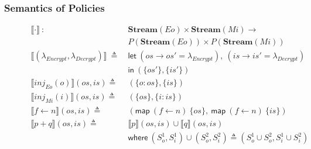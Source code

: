 \documentclass[12pt, letterpaper]{article}
\newcommand\interp[1]{\llbracket #1 \rrbracket}
\begin{document}
      \subsubsection{Semantics of Policies}\label{sec:spec:sem:pol}
        \begin{figure}
          \centering
          \begin{align*} 
            \interp{ \cdot }\ 
              :\ \ &
              \mathbf{Stream}(Eo)\times \mathbf{Stream}(Mi) \rightarrow \\
              & P(\mathbf{Stream}(Eo))\times P(\mathbf{Stream}(Mi)) 
              \\
            \interp{(\lambda_{Encrypt}, \lambda_{Decrypt})}\
              \triangleq\
              & \mathsf{let}\ (os \rightarrow os' = \lambda_{Encrypt}),
                            \ (is \rightarrow is' = \lambda_{Decrypt})\\
              & \mathsf{in}\
              (\{\mathit{os'}\}, \{\mathit{is'}\})
              \\
            \interp { inj_{Eo}(o) }(\mathit{os}, \mathit{is})
              \triangleq\ &
              (\{\mathit{o : os}\}, \{\mathit{is}\}) 
              \\
            \interp { inj_{Mi}(i) }(\mathit{os}, \mathit{is})
              \triangleq\ &
              (\{\mathit{os}\},\{ \mathit{i : is}\})
              \\
            \interp { f \leftarrow n }(os, is)
              \triangleq\ &
              (\mathsf{map}\ (f\leftarrow n)\ \{os\},\
               \mathsf{map}\ (f\leftarrow n)\ \{is\})
              \\ %
            \interp { p + q }(\mathit{os}, \mathit{is})
              \triangleq\ &
              \interp { p }(\mathit{os}, \mathit{is})\cup
              \interp { q }(\mathit{os}, \mathit{is}) \\
              &\mathsf{where}\ (S_o^1, S_i^1)\cup (S_o^2, S_i^2)\triangleq
                (S_o^1\cup S_o^2, S_i^1\cup S_i^2)\\

\end{align*}
\end{figure}
\end{document}
